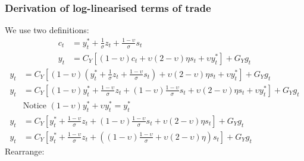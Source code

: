 \subsubsection{Derivation of log-linearised terms of trade}
We use two definitions:
\begin{align} \label{eq:terms_of_trade_derivation_beginning}
    c_t & = y^*_t + \frac{1}{\sigma}z_t + \frac{1-\upsilon}{\sigma}s_t\\
    y_t &= C_Y\left[(1-\upsilon)c_t + \upsilon (2-\upsilon)\eta s_t + \upsilon y^*_t\right] + G_Y g_t
\end{align}
\begin{align} 
    y_t &= C_Y\left[(1-\upsilon)\left( y^*_t + \frac{1}{\sigma}z_t + \frac{1-\upsilon}{\sigma}s_t \right) + \upsilon (2-\upsilon)\eta s_t + \upsilon y^*_t\right] + G_Y g_t\\
    y_t &= C_Y\left[(1-\upsilon)y^*_t + \frac{1-\upsilon}{\sigma}z_t + (1-\upsilon)\frac{1-\upsilon}{\sigma}s_t + \upsilon (2-\upsilon)\eta s_t + \upsilon y^*_t\right] + G_Y g_t\\
    &\text{Notice $(1-\upsilon)y^*_t + \upsilon y^*_t = y^*_t$} \nonumber \\
    y_t &= C_Y\left[y^*_t + \frac{1-\upsilon}{\sigma}z_t + (1-\upsilon)\frac{1-\upsilon}{\sigma}s_t + \upsilon (2-\upsilon)\eta s_t\right] + G_Y g_t\\
    y_t &= C_Y\left[y^*_t + \frac{1-\upsilon}{\sigma}z_t + \left((1-\upsilon)\frac{1-\upsilon}{\sigma} + \upsilon (2-\upsilon)\eta \right) s_t\right] + G_Y g_t
\end{align} 
Rearrange:
